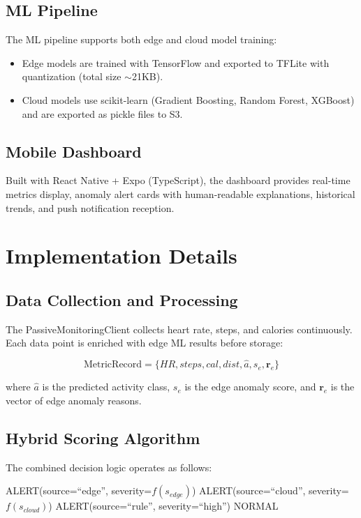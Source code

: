 \documentclass[conference]{IEEEtran}
\begin{document}
\subsection{ML Pipeline}
The ML pipeline supports both edge and cloud model training:
\begin{itemize}
    \item Edge models are trained with TensorFlow and exported to TFLite with quantization (total size $\sim$21KB).
    \item Cloud models use scikit-learn (Gradient Boosting, Random Forest, XGBoost) and are exported as pickle files to S3.
\end{itemize}

\subsection{Mobile Dashboard}
Built with React Native + Expo (TypeScript), the dashboard provides real-time metrics display, anomaly alert cards with human-readable explanations, historical trends, and push notification reception.

\section{Implementation Details}

\subsection{Data Collection and Processing}
The PassiveMonitoringClient collects heart rate, steps, and calories continuously. Each data point is enriched with edge ML results before storage:

\begin{equation}
\text{MetricRecord} = \{HR, steps, cal, dist, \hat{a}, s_e, \mathbf{r}_e\}
\end{equation}

where $\hat{a}$ is the predicted activity class, $s_e$ is the edge anomaly score, and $\mathbf{r}_e$ is the vector of edge anomaly reasons.

\subsection{Hybrid Scoring Algorithm}
The combined decision logic operates as follows:
\begin{algorithmic}
    \STATE ALERT(source=``edge'', severity=$f(s_{edge})$)
    \STATE ALERT(source=``cloud'', severity=$f(s_{cloud})$)
    \STATE ALERT(source=``rule'', severity=``high'')
\ELSE
    \STATE NORMAL
\ENDIF
\end{algorithmic}
\end{document}
